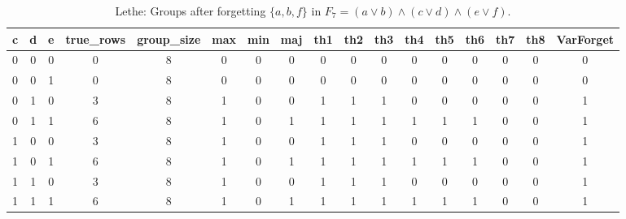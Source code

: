 \begin{table}[!tb]
    \centering
    \begin{tabular}{|c|c|c|c|c|c|c|c|c|c|c|c|c|c|c|c|c|}
        \hline
        \textbf{c} & \textbf{d} & \textbf{e} & \textbf{true\_rows} & \textbf{group\_size} & \textbf{max} & \textbf{min} & \textbf{maj} & \textbf{th1} & \textbf{th2} & \textbf{th3} & \textbf{th4} & \textbf{th5} & \textbf{th6} & \textbf{th7} & \textbf{th8} & \textbf{VarForget} \\ \hline
        \rowcolor{gray!40} 0 & 0 & 0 & 0 & 8 & 0 & 0 & 0 & 0 & 0 & 0 & 0 & 0 & 0 & 0 & 0 & 0 \\ \hline
        \rowcolor{blue!40} 0 & 0 & 1 & 0 & 8 & 0 & 0 & 0 & 0 & 0 & 0 & 0 & 0 & 0 & 0 & 0 & 0 \\ \hline
        \rowcolor{red!40} 0 & 1 & 0 & 3 & 8 & 1 & 0 & 0 & 1 & 1 & 1 & 0 & 0 & 0 & 0 & 0 & 1 \\ \hline
        \rowcolor{green!40} 0 & 1 & 1 & 6 & 8 & 1 & 0 & 1 & 1 & 1 & 1 & 1 & 1 & 1 & 0 & 0 & 1 \\ \hline
        \rowcolor{yellow!40} 1 & 0 & 0 & 3 & 8 & 1 & 0 & 0 & 1 & 1 & 1 & 0 & 0 & 0 & 0 & 0 & 1 \\ \hline
        \rowcolor{gray!40} 1 & 0 & 1 & 6 & 8 & 1 & 0 & 1 & 1 & 1 & 1 & 1 & 1 & 1 & 0 & 0 & 1 \\ \hline
        \rowcolor{blue!40} 1 & 1 & 0 & 3 & 8 & 1 & 0 & 0 & 1 & 1 & 1 & 0 & 0 & 0 & 0 & 0 & 1 \\ \hline
        \rowcolor{red!40} 1 & 1 & 1 & 6 & 8 & 1 & 0 & 1 & 1 & 1 & 1 & 1 & 1 & 1 & 0 & 0 & 1 \\ \hline
    \end{tabular}
    \caption{Lethe: Groups after forgetting $\{a, b, f\}$ in $F_{7} = (a \lor b) \land (c \lor d) \land (e \lor f)$.}
    \label{tab:lethe-F7-abf-groups}
\end{table}
